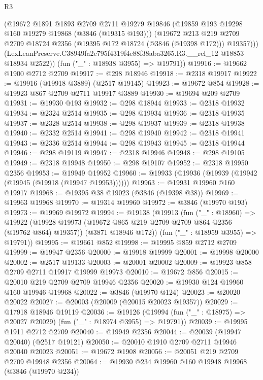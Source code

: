 \begin{lexlean}{R3}
\begin{coremodule}
          (@19672
            @1891
            @1893
            @2709
            @2711
            @19279
            @19846
            (@19859 @193 @19298 @160 @19279 @19868 (@3846 (@19315 @193)))
            (@19672
              @213
              @219
              @2709
              @2709
              @18724
              @2356
              (@19395 @172 @18724 (@3846 (@19398 @172)))
              @19357)))
        (LexLeanPreserve.C38949fa2c795f4319f4e88f38aba3265.R3.__rel_12 @18853 @18934 @2522))
      (fun ("_" : @18938 @3955) => @19791))
@19916 := @19662 @1900 @2712 @2709
@19917 := @298 @18946
@19918 := @2318 @19917
@19922 := @19916 (@19918 @3889) (@2517 @19145)
@19923 := @19672 @854
@19928 := @19923 @867 @2709 @2711 @19917 @3889
@19930 := @19694 @209 @2709
@19931 := @19930 @193
@19932 := @298 @18944
@19933 := @2318 @19932
@19934 := @2324 @2514
@19935 := @298 @19934
@19936 := @2318 @19935
@19937 := @2328 @2514
@19938 := @298 @19937
@19939 := @2318 @19938
@19940 := @2332 @2514
@19941 := @298 @19940
@19942 := @2318 @19941
@19943 := @2336 @2514
@19944 := @298 @19943
@19945 := @2318 @19944
@19946 := @298 @19119
@19947 := @2318 @19946
@19948 := @298 @19105
@19949 := @2318 @19948
@19950 := @298 @19107
@19952 := @2318 @19950 @2356
@19953 := @19949 @19952
@19960 := @19933 (@19936 (@19939 (@19942 (@19945 (@19918 (@19947 @19953))))))
@19963 := @19931 @19960 @160 @19917
@19968 := @19395 @38 @19023 (@3846 (@19398 @38))
@19969 := @19963 @19968
@19970 := @19314 @19960
@19972 := @3846 (@19970 @193)
@19973 := @19969 @19972
@19994 := @19138
    (@19913
      (fun ("_" : @18960) =>
      @19922
        (@19928 @19973 (@19672 @865 @219 @2709 @2709 @864 @2356 (@19762 @864) @19357))
        (@3871 @18946 @172))
      (fun ("_" : @18959 @3955) => @19791))
@19995 := @19661 @852
@19998 := @19995 @859 @2712 @2709
@19999 := @19947 @2356
@20000 := @19918 @19999
@20001 := @19998 @20000
@20002 := @2517 @19133
@20003 := @20001 @20002
@20009 := @19923 @858 @2709 @2711 @19917 @19999 @19973
@20010 := @19672 @856
@20015 := @20010 @219 @2709 @2709 @19946 @2356
@20020 := @19930 @124 @19960 @160 @19946 @19968
@20022 := @3846 (@19970 @124)
@20023 := @20020 @20022
@20027 := @20003 (@20009 (@20015 @20023 @19357))
@20029 := @17918 @18946 @19119
@20036 := @19126 (@19994 (fun ("_" : @18975) => @20027 @20029) (fun ("_" : @18974 @3955) => @19791))
@20039 := @19995 @1911 @2712 @2709
@20040 := @19949 @2356
@20044 := @20039 (@19947 @20040) (@2517 @19121)
@20050 := @20010 @1910 @2709 @2711 @19946 @20040 @20023
@20051 := @19672 @1908
@20056 := @20051 @219 @2709 @2709 @19948 @2356
@20064 := @19930 @234 @19960 @160 @19948 @19968 (@3846 (@19970 @234))

\end{coremodule}
\end{lexlean}
